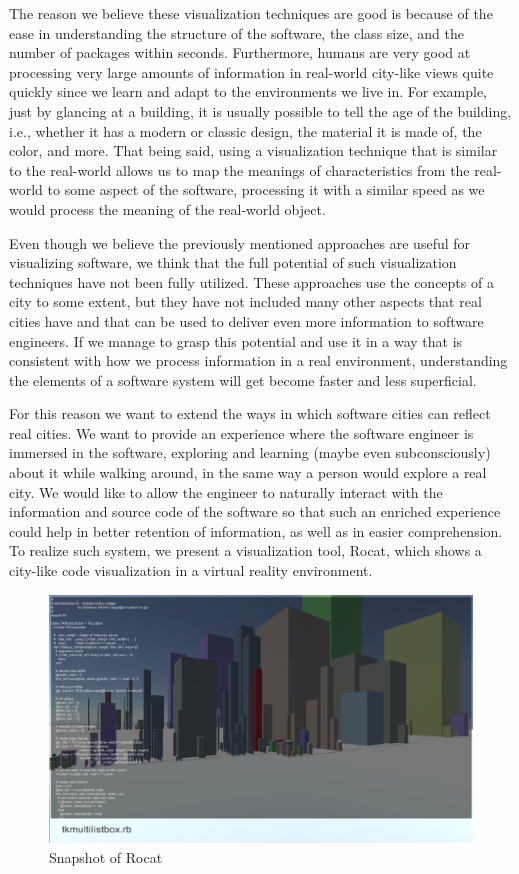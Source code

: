 \documentclass[conference]{IEEEtran}
\begin{document}
The reason we believe these visualization techniques are good is because of the ease in understanding the structure of the software, the class size, and the number of packages within seconds.
Furthermore, humans are very good at processing very large amounts of information in real-world city-like views quite quickly since we learn and adapt to the environments we live in.
For example, just by glancing at a building, it is usually possible to tell the age of the building, i.e., whether it has a modern or classic design, the material it is made of, the color, and more. 
That being said, using a visualization technique that is similar to the real-world allows us to map the meanings of characteristics from the real-world to some aspect of the software, processing it with a similar speed as we would process the meaning of the real-world object.

Even though we believe the previously mentioned approaches are useful for visualizing software, we think that the full potential of such visualization techniques have not been fully utilized.
These approaches use the concepts of a city to some extent, but they have not included many other aspects that real cities have and that can be used to deliver even more information to software engineers. 
If we manage to grasp this potential and use it in a way that is consistent with how we process information in a real environment, understanding the elements of a software system will get become faster and less superficial.

For this reason we want to extend the ways in which software cities can reflect real cities.
We want to provide an experience where the software engineer is immersed in the software, exploring and learning (maybe even subconsciously) about it while walking around, in the same way a person would explore a real city.
We would like to allow the engineer to naturally interact with the information and source code of the software so that such an enriched experience could help in better retention of information, as well as in easier comprehension.
To realize such system, we present a visualization tool, \textsf{Rocat}, which shows a city-like code visualization in a virtual reality environment.


\begin{figure}[t!]
\centering
\includegraphics[bb=0 0 1598 937, width=18cm]{rocat.png}
\caption{Snapshot of \textsf{Rocat}}
\label{figure:Rocat}
\end{figure}
\end{document}
